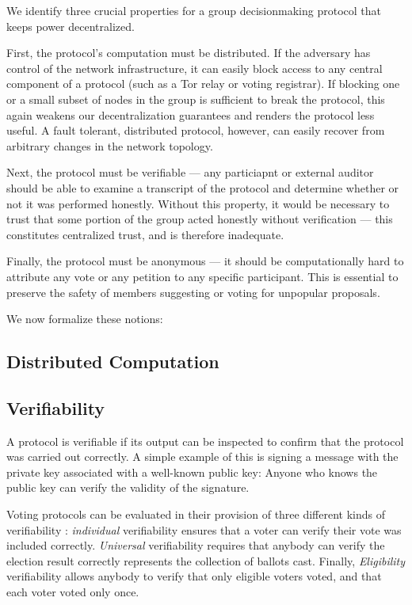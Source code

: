 We identify three crucial properties for a group decisionmaking protocol that
keeps power decentralized.

First, the protocol's computation must be distributed. If the adversary has
control of the network infrastructure, it can easily block access to any central
component of a protocol (such as a Tor relay \tocite or voting
registrar). If blocking one or a small
subset of nodes in the group is sufficient to break the protocol, this again
weakens our decentralization guarantees and renders the protocol less useful. A
fault tolerant, distributed protocol, however, can easily recover from arbitrary
changes in the network topology.

Next, the protocol must be verifiable --- any particiapnt or external auditor
should be able to examine a transcript of the protocol and determine whether or
not it was performed honestly. Without this property, it would be necessary to
trust that some portion of the group acted honestly without verification ---
this constitutes centralized trust, and is therefore inadequate.

Finally, the protocol must be anonymous --- it should be computationally hard to
attribute any vote or any petition to any specific participant. This is
essential to preserve the safety of members suggesting or voting for unpopular
proposals.

We now formalize these notions:
\subsection{Distributed Computation}\label{Subsection:distr}
\subsection{Verifiability}\label{Section:verif}
A protocol is verifiable if its output can be inspected to confirm that the
protocol was carried out correctly. A simple example of this is signing a
message with the private key associated with a well-known public key: Anyone
who knows the public key can verify the validity of the signature.

Voting protocols can be evaluated in their provision of three different
kinds of verifiability \cite{kremer_election_2010}: \emph{individual}
verifiability ensures that a voter can verify their vote was included
correctly. \emph{Universal} verifiability requires that anybody can verify
the election result correctly represents the collection of ballots cast.
Finally, \emph{Eligibility} verifiability allows anybody to verify that
only eligible voters voted, and that each voter voted only once.


